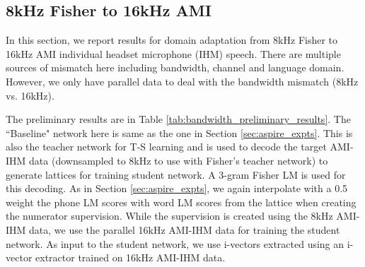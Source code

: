 \documentclass{article}
\begin{document}
\subsection{8kHz Fisher to 16kHz AMI}
\label{sec:fisher_ami_expts}

In this section, we report results for domain adaptation from 8kHz Fisher 
to 16kHz AMI \cite{ami-corpus} individual headset microphone (IHM) speech. 
There are multiple sources
of mismatch here including bandwidth, channel and language domain. However,
we only have parallel data to deal with the bandwidth mismatch 
(8kHz vs. 16kHz).

The preliminary results are in Table \ref{tab:bandwidth_preliminary_results}.
The ``Baseline" network here is same as the one in Section \ref{sec:aspire_expts}.
This is also the teacher network for T-S learning and is used to decode the 
target AMI-IHM data (downsampled to 8kHz to use with Fisher's teacher network) 
to generate lattices for training student network. 
A 3-gram Fisher LM is used for this decoding. 
As in Section \ref{sec:aspire_expts}, we again
interpolate with a 0.5 weight the phone LM scores with word LM scores from the
lattice when creating the numerator supervision. 
While the supervision is created using the 
8kHz AMI-IHM data, we use the parallel 16kHz AMI-IHM data for training the 
student network.
As input to the student network, we use i-vectors extracted using an i-vector
extractor trained on 16kHz AMI-IHM data.
\end{document}
